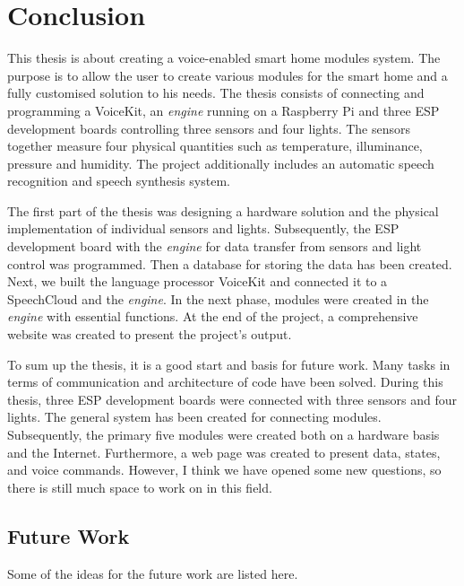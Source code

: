 \chapter{Conclusion} \label{chap:conclusion}
This thesis is about creating a voice-enabled smart home modules system. The purpose is to allow the user to create various modules for the smart home and a fully customised solution to his needs. The thesis consists of connecting and programming a VoiceKit, an \textit{engine} running on a Raspberry Pi and three ESP development boards controlling three sensors and four lights. The sensors together measure four physical quantities such as temperature, illuminance, pressure and humidity. The project additionally includes an automatic speech recognition and speech synthesis system. 

The first part of the thesis was designing a hardware solution and the physical implementation of individual sensors and lights. Subsequently, the ESP development board with the \textit{engine} for data transfer from sensors and light control was programmed. Then a database for storing the data has been created. Next, we built the language processor VoiceKit and connected it to a SpeechCloud and the \textit{engine}. In the next phase, modules were created in the \textit{engine} with essential functions. At the end of the project, a comprehensive website was created to present the project's output. 

To sum up the thesis, it is a good start and basis for future work. Many tasks in terms of communication and architecture of code have been solved. During this thesis, three ESP development boards were connected with three sensors and four lights. The general system has been created for connecting modules. Subsequently, the primary five modules were created both on a hardware basis and the Internet. Furthermore, a web page was created to present data, states, and voice commands. However, I think we have opened some new questions, so there is still much space to work on in this field. 
\newpage
\section{Future Work} \label{sec:future_work}
Some of the ideas for the future work are listed here.

